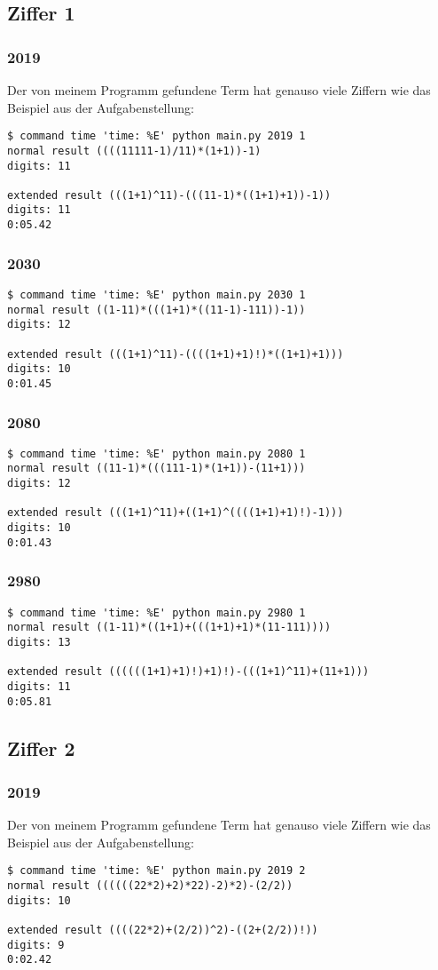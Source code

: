 \subsection{Ziffer 1}
\subsubsection{2019}
Der von meinem Programm gefundene Term hat genauso viele Ziffern wie das Beispiel aus der Aufgabenstellung:
\begin{lstlisting}
$ command time 'time: %E' python main.py 2019 1
normal result ((((11111-1)/11)*(1+1))-1)
digits: 11

extended result (((1+1)^11)-(((11-1)*((1+1)+1))-1))
digits: 11
0:05.42
\end{lstlisting}
\subsubsection{2030}
\begin{lstlisting}
$ command time 'time: %E' python main.py 2030 1
normal result ((1-11)*(((1+1)*((11-1)-111))-1))
digits: 12

extended result (((1+1)^11)-((((1+1)+1)!)*((1+1)+1)))
digits: 10
0:01.45
\end{lstlisting}
\subsubsection{2080}
\begin{lstlisting}
$ command time 'time: %E' python main.py 2080 1
normal result ((11-1)*(((111-1)*(1+1))-(11+1)))
digits: 12

extended result (((1+1)^11)+((1+1)^((((1+1)+1)!)-1)))
digits: 10
0:01.43
\end{lstlisting}
\subsubsection{2980}
\begin{lstlisting}
$ command time 'time: %E' python main.py 2980 1
normal result ((1-11)*((1+1)+(((1+1)+1)*(11-111))))
digits: 13

extended result ((((((1+1)+1)!)+1)!)-(((1+1)^11)+(11+1)))
digits: 11
0:05.81
\end{lstlisting}
\subsection{Ziffer 2}
\subsubsection{2019}
Der von meinem Programm gefundene Term hat genauso viele Ziffern wie das Beispiel aus der Aufgabenstellung:
\begin{lstlisting}
$ command time 'time: %E' python main.py 2019 2
normal result ((((((22*2)+2)*22)-2)*2)-(2/2))
digits: 10

extended result ((((22*2)+(2/2))^2)-((2+(2/2))!))
digits: 9
0:02.42
\end{lstlisting}
